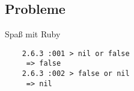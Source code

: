 \subsection{Probleme}

\begin{frame}[containsverbatim]{\insertsectionhead}{\insertsubsectionhead}
  \begin{block}{Spaß mit Ruby}
    \begin{lstlisting}
    2.6.3 :001 > nil or false
     => false 
    2.6.3 :002 > false or nil
     => nil
    \end{lstlisting}
  \end{block}
\end{frame}
